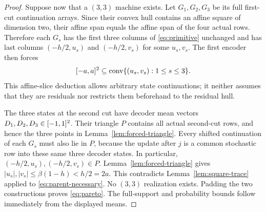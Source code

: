 \begin{proof}
Suppose now that a $(3,3)$ machine exists. Let $G_1,G_2,G_3$ be its
full first-cut continuation arrays. Since their convex hull contains
an affine square of dimension two, their affine span equals the affine
span of the four actual rows. Therefore each $G_s$ has the first three
columns of \eqref{eq:primitive} unchanged and has last columns
$(-h/2,u_s)$ and $(-h/2,v_s)$ for some $u_s,v_s$. The first encoder
then forces
\begin{equation}\label{eq:parent-necessary}
 [-a,a]^2\subseteq\operatorname{conv}\{(u_s,v_s):1\le s\le3\}.
\end{equation}
This affine-slice deduction allows arbitrary state continuations; it
neither assumes that they are residuals nor restricts them beforehand
to the residual hull.

The three states at the second cut have decoder mean vectors
$D_1,D_2,D_3\in[-1,1]^2$. Their triangle $P$ contains all actual
second-cut rows, and hence the three points in
Lemma~\ref{lem:forced-triangle}. Every shifted continuation of each
$G_s$ must also lie in $P$, because the update after $j$ is a common
stochastic row into these same three decoder states. In particular,
$(-h/2,u_s),(-h/2,v_s)\in P$. Lemma~\ref{lem:forced-triangle} gives
$|u_s|,|v_s|\le\beta(1-h)<h/2=2a$. This contradicts
Lemma~\ref{lem:square-trace} applied to \eqref{eq:parent-necessary}.
No $(3,3)$ realization exists. Padding the two constructions proves
\eqref{eq:pareto}. The full-support and probability bounds follow
immediately from the displayed means.
\end{proof}

